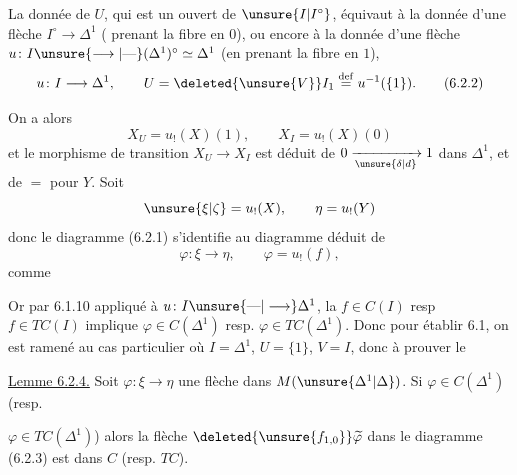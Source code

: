 La donnée de $U$, qui est un ouvert
de $\unsure{I|I^\circ}$, équivaut à la donnée d'une
flèche  $I^\circ\longrightarrow\Delta^1$ ( prenant la
fibre en $0$), ou encore à la donnée
d'une flèche $u\colon I\unsure{\longrightarrow|\text{---}}(\Delta^1)^\circ\simeq\Delta^1$
(en prenant la fibre en $1$), 
\[
 u\colon I\longrightarrow\Delta^1,\qquad
 U=\deleted{\unsure{V}}I_1\overset{\mathrm{def}}{=}u^{-1}(\{1\}).\tag*{(6.2.2)}
\]

On a alors
\[
 X_U=u_!(X)(1),\qquad X_I=u_!(X)(0)
\]
et le morphisme de transition
$X_U\longrightarrow X_I$ est déduit de  $0\xrightarrow[\unsure{\delta|d}]{}1$ dans
$\Delta^1$, et de $=$ pour $Y$. Soit
\[
 \unsure{\xi|\zeta}=u_!(X),\qquad \eta=u_!(Y)
\]
donc le diagramme (6.2.1) s'identifie
au diagramme déduit de
\[
 \varphi\colon \xi\longrightarrow\eta,\qquad \varphi=u_!(f),
\]
comme


Or par 6.1.10 appliqué à $u\colon I\unsure{\text{---}|\longrightarrow}\Delta^1$,
la  $f\in C(I)$ resp $f\in TC(I)$
implique $\varphi\in C(\Delta^1)$ resp. $\varphi\in TC(\Delta^1)$.
Donc pour établir 6.1, on est ramené
au cas particulier où $I=\Delta^1$, $U=\{1\}$, $V=I$,
donc à prouver le

\uline{Lemme 6.2.4.} Soit $\varphi\colon\xi\longrightarrow\eta$ une
flèche dans $M(\unsure{\Delta^1|\Delta})$. Si $\varphi\in C(\Delta^1)$ (resp.

$\varphi\in TC(\Delta^1)$) alors la flèche $\deleted{\unsure{f_{1,0}}}\widetilde{\varphi}$ dans
le diagramme (6.2.3) est dans $C$ (resp. $TC$).

